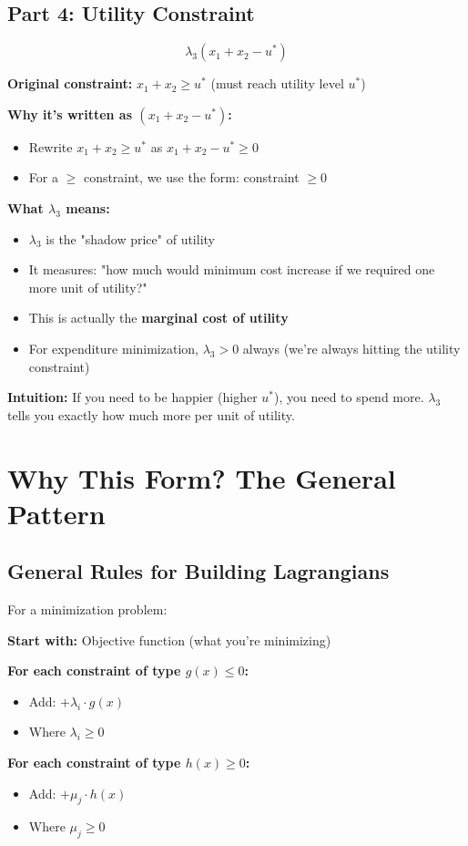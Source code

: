 \documentclass[11pt]{article}
\begin{document}
\subsection{Part 4: Utility Constraint}

\begin{equation}
\boxed{\lambda_3(x_1 + x_2 - u^*)}
\end{equation}

\textbf{Original constraint:} $x_1 + x_2 \geq u^*$ (must reach utility level $u^*$)

\textbf{Why it's written as $(x_1 + x_2 - u^*)$:}
\begin{itemize}
\item Rewrite $x_1 + x_2 \geq u^*$ as $x_1 + x_2 - u^* \geq 0$
\item For a $\geq$ constraint, we use the form: constraint $\geq 0$
\end{itemize}

\textbf{What $\lambda_3$ means:}
\begin{itemize}
\item $\lambda_3$ is the "shadow price" of utility
\item It measures: "how much would minimum cost increase if we required one more unit of utility?"
\item This is actually the \textbf{marginal cost of utility}
\item For expenditure minimization, $\lambda_3 > 0$ always (we're always hitting the utility constraint)
\end{itemize}

\textbf{Intuition:} If you need to be happier (higher $u^*$), you need to spend more. $\lambda_3$ tells you exactly how much more per unit of utility.

\section{Why This Form? The General Pattern}

\subsection{General Rules for Building Lagrangians}

For a minimization problem:

\begin{tcolorbox}[colback=yellow!10!white,colframe=orange!75!black,title=Lagrangian Recipe]
\textbf{Start with:} Objective function (what you're minimizing)

\textbf{For each constraint of type $g(x) \leq 0$:}
\begin{itemize}
\item Add: $+\lambda_i \cdot g(x)$
\item Where $\lambda_i \geq 0$
\end{itemize}

\textbf{For each constraint of type $h(x) \geq 0$:}
\begin{itemize}
\item Add: $+\mu_j \cdot h(x)$
\item Where $\mu_j \geq 0$
\end{itemize}
\end{tcolorbox}
\end{document}
